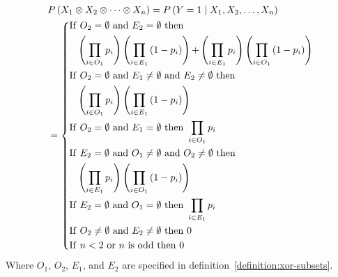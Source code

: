 \documentclass{article}
\numberwithin{equation}{section}
\numberwithin{figure}{section}
\numberwithin{table}{section}
\begin{document}
\begin{equation}
\begin{split}
&P\left(X_1\otimes X_2\otimes \dots \otimes X_n\right)=P\left(Y=1\mathrel{\left|\vphantom{Y=1 X_1,X_2,\dots ,X_n}\right.\kern-\nulldelimiterspace}X_1,X_2,\dots ,X_n\right)\\
&=\left\{\begin{aligned}
\mathrm{If}&\ O_2=\emptyset\ \mathrm{and}\ E_2=\emptyset\ \mathrm{then}\\
&\left(\prod_{i\in O_1}{p_i}\right)\left(\prod_{i\in E_1}{\left(1-p_i\right)}\right)\mathrm{+}\left(\prod_{i\in E_1}{p_i}\right)\left(\prod_{i\in O_1}{\left(1-p_i\right)}\right)\\
\mathrm{If}&\ O_2=\emptyset\ \mathrm{and}\ E_1\neq \emptyset\ \mathrm{and}\ E_2\neq \emptyset\ \mathrm{then}\\
&\left(\prod_{i\in O_1}{p_i}\right)\left(\prod_{i\in E_1}{\left(1-p_i\right)}\right)\\
\mathrm{If}&\ O_2=\emptyset\ \mathrm{and}\ E_1=\emptyset\ \mathrm{then}\ \prod_{i\in O_1}{p_i}\\
\mathrm{If}&\ E_2=\emptyset\ \mathrm{and}\ O_1\neq \emptyset \ \mathrm{and}\ O_2\neq \emptyset\ \mathrm{then}\\
&\left(\prod_{i\in E_1}{p_i}\right)\left(\prod_{i\in O_1}{\left(1-p_i\right)}\right)\\
\mathrm{If}&\ E_2=\emptyset\ \mathrm{and}\ O_1=\emptyset\ \mathrm{then}\ \prod_{i\in E_1}{p_i}\\
\mathrm{If}&\ O_2\neq \emptyset\ \mathrm{and}\ E_2\neq \emptyset\ \mathrm{then}\ 0\\
\mathrm{If}&\ n<2\ \mathrm{or}\ n\ \mathrm{is\ odd}\ \mathrm{then}\ 0
\end{aligned}\right.
\end{split}
\label{formula:xor-gate-inference}
\end{equation} 
Where $O_1$, $O_2$, $E_1$, and $E_2$ are specified in definition~\ref{definition:xor-subsets}.
\end{document}

